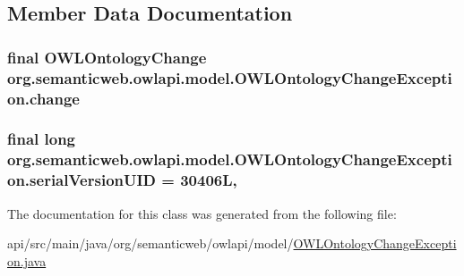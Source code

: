 \subsection{Member Data Documentation}
\hypertarget{classorg_1_1semanticweb_1_1owlapi_1_1model_1_1_o_w_l_ontology_change_exception_a9e4c14dc90fcc563956fb7207c67640a}{
\subsubsection[{change}]{\setlength{\rightskip}{0pt plus 5cm}final {\bf O\-W\-L\-Ontology\-Change} org.\-semanticweb.\-owlapi.\-model.\-O\-W\-L\-Ontology\-Change\-Exception.\-change\hspace{0.3cm}{\ttfamily [private]}}}\label{classorg_1_1semanticweb_1_1owlapi_1_1model_1_1_o_w_l_ontology_change_exception_a9e4c14dc90fcc563956fb7207c67640a}
\hypertarget{classorg_1_1semanticweb_1_1owlapi_1_1model_1_1_o_w_l_ontology_change_exception_a12c1022377a3c714d80eea86bec3c1e2}{
\subsubsection[{serial\-Version\-U\-I\-D}]{\setlength{\rightskip}{0pt plus 5cm}final long org.\-semanticweb.\-owlapi.\-model.\-O\-W\-L\-Ontology\-Change\-Exception.\-serial\-Version\-U\-I\-D = 30406\-L\hspace{0.3cm}{\ttfamily [static]}, {\ttfamily [private]}}}\label{classorg_1_1semanticweb_1_1owlapi_1_1model_1_1_o_w_l_ontology_change_exception_a12c1022377a3c714d80eea86bec3c1e2}


The documentation for this class was generated from the following file\-:\begin{DoxyCompactItemize}
\item 
api/src/main/java/org/semanticweb/owlapi/model/\hyperlink{_o_w_l_ontology_change_exception_8java}{O\-W\-L\-Ontology\-Change\-Exception.\-java}\end{DoxyCompactItemize}
